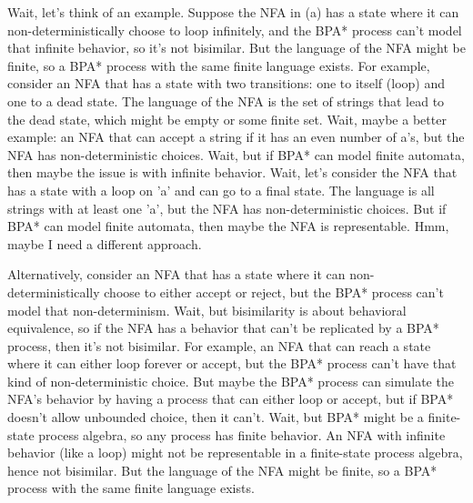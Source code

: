 Wait, let's think of an example. Suppose the NFA in (a) has a state where it can non-deterministically choose to loop infinitely, and the BPA* process can't model that infinite behavior, so it's not bisimilar. But the language of the NFA might be finite, so a BPA* process with the same finite language exists. For example, consider an NFA that has a state with two transitions: one to itself (loop) and one to a dead state. The language of the NFA is the set of strings that lead to the dead state, which might be empty or some finite set. Wait, maybe a better example: an NFA that can accept a string if it has an even number of a's, but the NFA has non-deterministic choices. Wait, but if BPA* can model finite automata, then maybe the issue is with infinite behavior. Wait, let's consider the NFA that has a state with a loop on 'a' and can go to a final state. The language is all strings with at least one 'a', but the NFA has non-deterministic choices. But if BPA* can model finite automata, then maybe the NFA is representable. Hmm, maybe I need a different approach.

Alternatively, consider an NFA that has a state where it can non-deterministically choose to either accept or reject, but the BPA* process can't model that non-determinism. Wait, but bisimilarity is about behavioral equivalence, so if the NFA has a behavior that can't be replicated by a BPA* process, then it's not bisimilar. For example, an NFA that can reach a state where it can either loop forever or accept, but the BPA* process can't have that kind of non-deterministic choice. But maybe the BPA* process can simulate the NFA's behavior by having a process that can either loop or accept, but if BPA* doesn't allow unbounded choice, then it can't. Wait, but BPA* might be a finite-state process algebra, so any process has finite behavior. An NFA with infinite behavior (like a loop) might not be representable in a finite-state process algebra, hence not bisimilar. But the language of the NFA might be finite, so a BPA* process with the same finite language exists.

